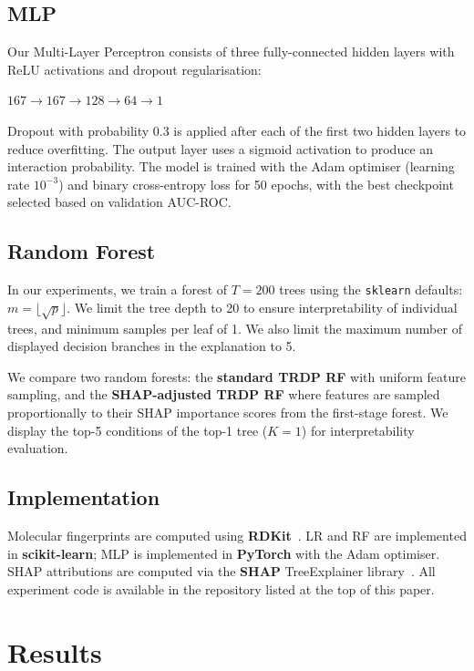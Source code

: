 \documentclass[letterpaper]{article} %
\begin{document}
\subsection{MLP}
Our Multi-Layer Perceptron consists of three fully-connected hidden layers with ReLU activations and dropout regularisation:

\begin{center}
    $167 \rightarrow 167 \rightarrow 128 \rightarrow 64 \rightarrow 1$
\end{center}

Dropout with probability 0.3 is applied after each of the first two hidden layers to reduce overfitting. The output layer uses a sigmoid activation to produce an interaction probability. The model is trained with the Adam optimiser (learning rate $10^{-3}$) and binary cross-entropy loss for 50 epochs, with the best checkpoint selected based on validation AUC-ROC.

\subsection{Random Forest}
 In our experiments, we train a forest of $T = 200$ trees using the \texttt{sklearn} defaults: $m = \lfloor\sqrt{p}\rfloor$. We limit the tree depth to 20 to ensure interpretability of individual trees, and minimum samples per leaf of 1. We also limit the maximum number of displayed decision branches in the explanation to 5.

We compare two random forests: the \textbf{standard TRDP RF} with uniform feature sampling, and the \textbf{SHAP-adjusted TRDP RF} where features are sampled proportionally to their SHAP importance scores from the first-stage forest. We display the top-5 conditions of the top-1 tree ($K=1$) for interpretability evaluation.

\subsection{Implementation}
Molecular fingerprints are computed using \textbf{RDKit}~\cite{rdkit}. LR and RF are implemented in \textbf{scikit-learn}; MLP is implemented in \textbf{PyTorch} with the Adam optimiser. SHAP attributions are computed via the \textbf{SHAP} TreeExplainer library~\cite{Lundberg2020}. All experiment code is available in the repository listed at the top of this paper.

\section{Results}
\end{document}
